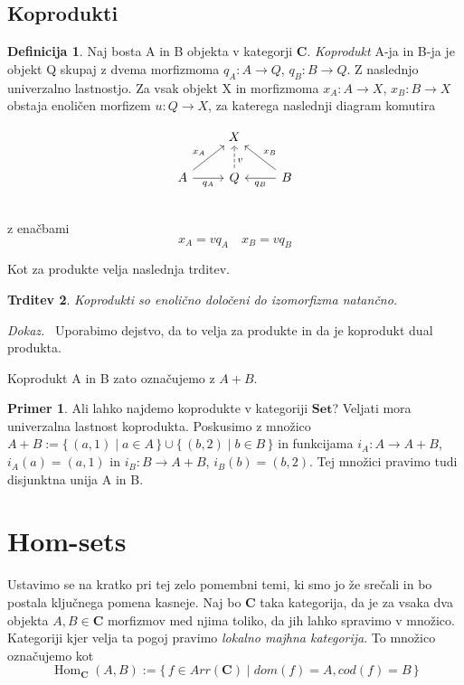\documentclass[12pt,a4paper]{book}
\theoremstyle{definition}
\newtheorem{definicija}{Definicija}[chapter]
\theoremstyle{plain}
\newtheorem{trditev}[definicija]{Trditev}
\newenvironment{dokaz}{\emph{Dokaz.}\ }{\hspace{\fill}{$\Box$}}
\theoremstyle{definition}
\newtheorem{primer}{Primer}[section]
\theoremstyle{remark}
\newcommand{\cat}[1]{\textbf{#1}}
\DeclareMathOperator{\Hom}{Hom}
\renewcommand{\set}[1]{\{\,#1\,\}}
\begin{document}
\subsection{Koprodukti}
\begin{definicija}
Naj bosta A in B objekta v kategorji $\cat{C}$. \textit{Koprodukt} A-ja in B-ja je objekt Q skupaj z dvema morfizmoma $q_A : A \to Q$, $q_B : B \to Q$. Z naslednjo univerzalno lastnostjo. Za vsak objekt X in morfizmoma $x_A : A \to X$, $x_B : B \to X$ obstaja enoličen morfizem $u : Q \to X$, za katerega naslednji diagram komutira

$$\begin{tikzcd}
& X & \\
A \ar[ur, "x_A"] \ar[r, "q_A"'] & Q \ar[u, dashed, pos=0.35, "v"']  & B \ar[l, "q_B"] \ar[ul, "x_B"'] \\
\end{tikzcd}$$
z enačbami
$$x_A = v q_A \quad x_B = v q_B$$
\end{definicija}
Kot za produkte velja naslednja trditev.
\begin{trditev}
Koprodukti so enolično določeni do izomorfizma natančno.
\end{trditev}
\begin{dokaz}
Uporabimo dejstvo, da to velja za produkte in da je koprodukt dual produkta.
\end{dokaz}

Koprodukt A in B zato označujemo z $A + B$.
\begin{primer}
Ali lahko najdemo koprodukte v kategoriji $\cat{Set}$? 
Veljati mora univerzalna lastnost koprodukta.
Poskusimo z množico $A+B := \set{(a,1) \mid a \in A} \cup \set{(b,2) \mid b \in B}$ in funkcijama $i_A : A \to A + B$, $i_A(a) = (a,1)$ in $i_B : B \to A+B$, $i_B(b) = (b,2)$. Tej množici pravimo tudi disjunktna unija A in B.
\end{primer}

\section{Hom-sets}
Ustavimo se na kratko pri tej zelo pomembni temi, ki smo jo že srečali in bo postala ključnega pomena kasneje. Naj bo $\cat{C}$ taka kategorija, da je za vsaka dva objekta $A,B \in \cat{C}$ morfizmov med njima toliko, da jih lahko spravimo v množico. Kategoriji kjer velja ta pogoj pravimo \textit{lokalno majhna kategorija}. To množico označujemo kot
$$\Hom_{\cat{C}}(A,B) := \set{f \in Arr(\cat{C}) \mid dom(f) = A, cod(f) = B}$$
\end{document}
